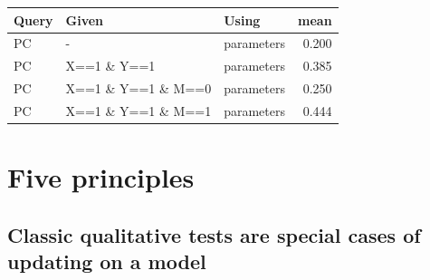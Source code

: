 \documentclass[12pt,]{book}
\newenvironment{Shaded}{\begin{snugshade}}{\end{snugshade}}
\newcommand{\DataTypeTok}[1]{\textcolor[rgb]{0.13,0.29,0.53}{#1}}
\newcommand{\DecValTok}[1]{\textcolor[rgb]{0.00,0.00,0.81}{#1}}
\newcommand{\FloatTok}[1]{\textcolor[rgb]{0.00,0.00,0.81}{#1}}
\newcommand{\KeywordTok}[1]{\textcolor[rgb]{0.13,0.29,0.53}{\textbf{#1}}}
\newcommand{\NormalTok}[1]{#1}
\newcommand{\OperatorTok}[1]{\textcolor[rgb]{0.81,0.36,0.00}{\textbf{#1}}}
\newcommand{\OtherTok}[1]{\textcolor[rgb]{0.56,0.35,0.01}{#1}}
\newcommand{\StringTok}[1]{\textcolor[rgb]{0.31,0.60,0.02}{#1}}
\begin{document}
\begin{Shaded}
\end{Shaded}

\begin{tabular}{l|l|l|r}
\hline
Query & Given & Using & mean\\
\hline
PC & - & parameters & 0.200\\
\hline
PC & X==1 \& Y==1 & parameters & 0.385\\
\hline
PC & X==1 \& Y==1 \& M==0 & parameters & 0.250\\
\hline
PC & X==1 \& Y==1 \& M==1 & parameters & 0.444\\
\hline
\end{tabular}

\hypertarget{five-principles}{%
\section{Five principles}\label{five-principles}}

\hypertarget{classic-qualitative-tests-are-special-cases-of-updating-on-a-model}{%
\subsection{Classic qualitative tests are special cases of updating on a model}\label{classic-qualitative-tests-are-special-cases-of-updating-on-a-model}}
\end{document}
